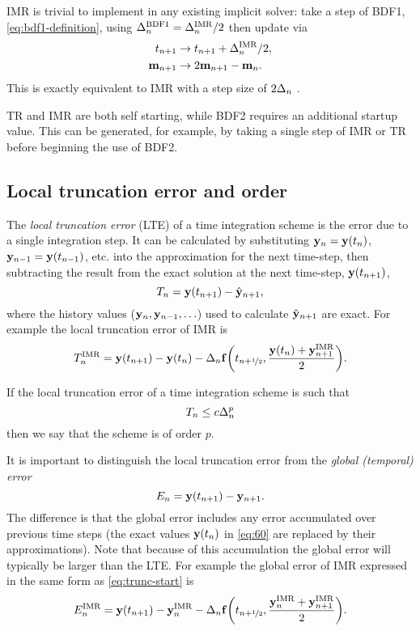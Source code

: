 IMR is trivial to implement in any existing implicit solver: take a step of BDF1, \cref{eq:bdf1-definition}, using $\Delta_{n}^{\text{BDF1}} = \Delta_{n}^{\text{IMR}}/2$ then update via
\begin{equation}
  \begin{aligned}
    t_{n+1} &\rightarrow t_{n+1} + \Delta_{n}^{\text{IMR}}/2, \\
    \mathbf{m}_{n+1} &\rightarrow 2\mathbf{m}_{n+1} - \mathbf{m}_n.
  \end{aligned}
\end{equation}
This is exactly equivalent to IMR with a step size of $2\Delta_{n}$ \cite{Malidi2005}.

TR and IMR are both self starting, while BDF2 requires an additional startup value.
This can be generated, for example, by taking a single step of IMR or TR before beginning the use of BDF2.


\subsection{Local truncation error and order}
\label{sec:deriv-local-trunc}

The \emph{local truncation error} (LTE) of a time integration scheme is the error due to a single integration step.
It can be calculated by substituting $\mathbf{y}_n = \mathbf{y}(t_n)$, $\mathbf{y}_{n-1} = \mathbf{y}(t_{n-1})$, etc. into the approximation for the next time-step, then subtracting the result from the exact solution at the next time-step, $\mathbf{y}(t_{n+1})$, \ie
\begin{equation}
  \label{eq:60}
  T_n = \mathbf{y}(t_{n+1}) - \hat{\mathbf{y}}_{n+1},
\end{equation}
where the history values ($\mathbf{y}_{n}, \mathbf{y}_{n-1}, \ldots$) used to calculate $\hat{\mathbf{y}}_{n+1}$ are exact.
For example the local truncation error of IMR is
\begin{equation}
  T_n^{\text{IMR}} =  \mathbf{y}(t_{n+1}) - \mathbf{y}(t_n) - \Delta_{n} {\mathbf{f}{\left( t_{n+\nicefrac{1}{2}}, \frac{\mathbf{y}(t_n) + \mathbf{y}_{n+1}^{\text{IMR}}}{2} \right)}}.
  \label{eq:trunc-start}
\end{equation}

If the local truncation error of a time integration scheme is such that 
\begin{equation}
  T_n \leq c \Delta_{n}^p
\end{equation}
then we say that the scheme is of order $p$.

It is important to distinguish the local truncation error from the \emph{global (temporal) error}
\begin{equation}
  \label{eq:global-temporal-error}
    E_n = \mathbf{y}(t_{n+1}) - \mathbf{y}_{n+1}.
\end{equation}
The difference is that the global error includes any error accumulated over previous time steps (\ie the exact values $\mathbf{y}(t_n)$ in \cref{eq:60} are replaced by their approximations).
Note that because of this accumulation the global error will typically be larger than the LTE.
For example the global error of IMR expressed in the same form as \cref{eq:trunc-start} is
\begin{equation}
  E_n^{\text{IMR}} =  \mathbf{y}(t_{n+1}) - \mathbf{y}_n^{\text{IMR}} - \Delta_{n} {\mathbf{f}{\left(  t_{n+\nicefrac{1}{2}}, \frac{\mathbf{y}_n^{\text{IMR}} + \mathbf{y}_{n+1}^{\text{IMR}}}{2}  \right)}}.
\end{equation}


